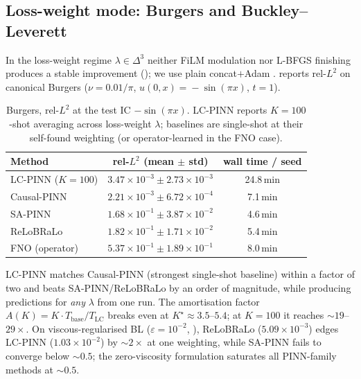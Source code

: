 \documentclass{article}
\theoremstyle{plain}
\theoremstyle{definition}
\theoremstyle{remark}
\begin{document}
\subsection{Loss-weight mode: Burgers and Buckley--Leverett}
\label{sec:results-burgers-bl}

In the loss-weight regime $\lambda \!\in\! \Delta^3$ neither FiLM
modulation nor L-BFGS finishing produces a stable improvement
(); we use plain concat$+$Adam
\citep{dosovitskiy2020}.  reports rel-$L^2$ on
canonical Burgers ($\nu \!=\! 0.01/\pi$, $u(0,x)\!=\!-\sin(\pi x)$,
$t\!=\!1$).

\begin{table}[h]
\centering
\caption{Burgers, rel-$L^2$ at the test IC $-\sin(\pi x)$. LC-PINN
reports $K\!=\!100$-shot averaging across loss-weight $\lambda$;
baselines are single-shot at their self-found weighting (or
operator-learned in the FNO case).}
\label{tab:burgers}
\begin{tabular}{lcc}
\toprule
Method & rel-$L^2$ (mean $\pm$ std) & wall time / seed \\
\midrule
LC-PINN ($K\!=\!100$) & $3.47 \times 10^{-3} \pm 2.73 \times 10^{-3}$ & 24.8\,min \\
Causal-PINN           & $2.21 \times 10^{-3} \pm 6.72 \times 10^{-4}$ &  7.1\,min \\
SA-PINN               & $1.68 \times 10^{-1} \pm 3.87 \times 10^{-2}$ &  4.6\,min \\
ReLoBRaLo             & $1.82 \times 10^{-1} \pm 1.71 \times 10^{-2}$ &  5.4\,min \\
FNO (operator)        & $5.37 \times 10^{-1} \pm 1.89 \times 10^{-1}$ &  8.0\,min \\
\bottomrule
\end{tabular}
\end{table}

LC-PINN matches Causal-PINN (strongest single-shot baseline) within
a factor of two and beats SA-PINN/ReLoBRaLo by an order of
magnitude, while producing predictions for \emph{any} $\lambda$ from
one run. The amortisation factor
$A(K)\!=\!K \cdot T_{\mathrm{base}}/T_{\mathrm{LC}}$ breaks even at
$K^\star \!\approx\! 3.5$--$5.4$; at $K\!=\!100$ it reaches
$\sim\!19$--$29\times$.
On viscous-regularised BL ($\varepsilon \!=\! 10^{-2}$,
), ReLoBRaLo ($5.09\!\times\!10^{-3}$) edges LC-PINN
($1.03\!\times\!10^{-2}$) by $\sim\!2\times$ at one weighting, while
SA-PINN fails to converge below $\sim\!0.5$; the zero-viscosity
formulation saturates all PINN-family methods at $\sim\!0.5$.
\end{document}
